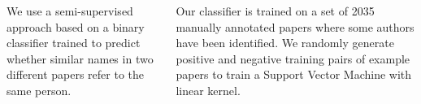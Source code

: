 \documentclass[30pt,a1paper]{tikzposter}
\begin{document}
\begin{columns}
{    We use a semi-supervised approach based on a binary
    classifier trained to predict whether similar names in two
    different papers refer to the same person.

    Our classifier is trained on a set of 2035 manually annotated
    papers where some authors have been identified. We randomly
    generate positive and negative training pairs of example
    papers to train a Support Vector Machine with linear kernel.
}






\end{columns}
\end{document}
